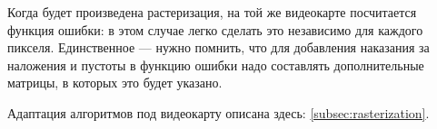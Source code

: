 \documentclass[11pt]{article}
\begin{document}
\begin{itemize}
                Когда будет произведена растеризация, на той же видеокарте посчитается функция ошибки: в этом случае легко сделать это независимо для каждого пикселя.
                Единственное — нужно помнить, что для добавления наказания за наложения и пустоты в функцию ошибки надо составлять дополнительные матрицы, в которых это будет указано.


                Адаптация алгоритмов под видеокарту описана здесь: \ref{subsec:rasterization}.



    \end{itemize}
\end{document}
